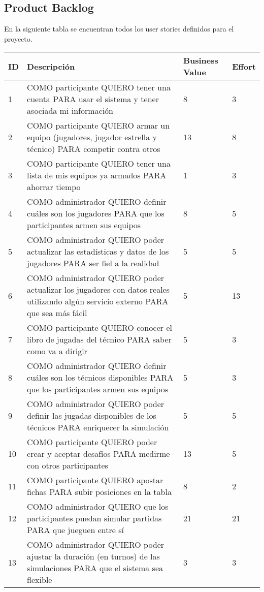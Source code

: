\subsection{Product Backlog}
\indent En la siguiente tabla se encuentran todos los user stories definidos para el proyecto.\\

\begin{center}
  \begin{tabular}{| l | p{10cm} | l | l | }
    \hline
ID & Descripción & Business Value & Effort\\  \hline
1 & COMO participante QUIERO tener una cuenta PARA usar el sistema y tener asociada mi información & 8 & 3\\  \hline
2 & COMO participante QUIERO armar un equipo (jugadores, jugador estrella y técnico) PARA competir contra otros & 13 & 8\\  \hline
3 & COMO participante QUIERO tener una lista de mis equipos ya armados PARA ahorrar tiempo & 1 & 3\\  \hline
4 & COMO administrador QUIERO definir cuáles son los jugadores PARA que los participantes armen sus equipos & 8 & 5\\  \hline
5 & COMO administrador QUIERO poder actualizar las estadísticas y datos de los jugadores PARA ser fiel a la realidad & 5 & 5\\  \hline
6 & COMO administrador QUIERO poder actualizar los jugadores con datos reales utilizando algún servicio externo PARA que sea más fácil & 5 & 13\\  \hline
7 & COMO participante QUIERO conocer el libro de jugadas del técnico PARA saber como va a dirigir & 5 & 3\\  \hline
8 & COMO administrador QUIERO definir cuáles son los técnicos disponibles PARA que los participantes armen sus equipos & 5 & 3\\  \hline
9 & COMO administrador QUIERO poder definir las jugadas disponibles de los técnicos PARA enriquecer la simulación & 5 & 5\\  \hline
10 & COMO participante QUIERO poder crear y aceptar desafíos PARA medirme con otros participantes & 13 & 5\\  \hline
11 & COMO participante QUIERO apostar fichas PARA subir posiciones en la tabla & 8 & 2\\  \hline
12 & COMO administrador QUIERO que los participantes puedan simular partidas PARA que jueguen entre sí & 21 & 21\\  \hline
13 & COMO administrador QUIERO poder ajustar la duración (en turnos) de las simulaciones PARA que el sistema sea flexible & 3 & 3\\  \hline

\end{tabular}
\end{center}
